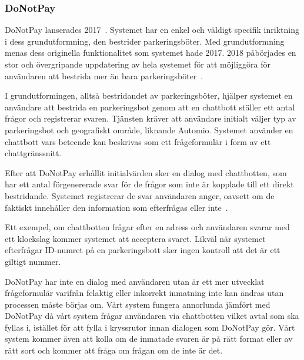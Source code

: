 \documentclass[a4paper,12pt]{article}
\begin{document}

\subsubsection{DoNotPay}
DoNotPay lanserades 2017~\cite{web:daily-mail-DoNotPay}. Systemet har en enkel och väldigt specifik inriktning i dess grundutformning, den bestrider parkeringsböter. Med grundutformning menas dess originella funktionalitet som systemet hade 2017. 2018 påbörjades en stor och övergripande uppdatering av hela systemet för att möjliggöra för användaren att bestrida mer än bara parkeringsböter~\cite{web:motherboard-DoNotPay}. 

I grundutformingen, alltså  bestridandet av parkeringsböter, hjälper systemet en anv\-ändare att bestrida en parkeringsbot genom att en chattbott ställer ett antal frågor och registrerar svaren. Tjänsten kräver att användare initialt väljer typ av parkeringsbot och geografiskt område, liknande Automio. Systemet använder en chattbott vars beteende kan beskrivas som ett frågeformulär i form av ett chattgränssnitt.

Efter att DoNotPay erhållit initialvärden sker en dialog med chattbotten, som har ett antal förgenererade svar för de frågor som inte är kopplade till ett direkt bestridande. Systemet registrerar de svar användaren anger, oavsett om de faktiskt innehåller den information som efterfrågas eller inte~\cite{web:pennyhoarder-DoNotPay}.

Ett exempel, om chattbotten frågar efter en adress och användaren svarar med ett klockslag kommer systemet att acceptera svaret. Likväl när systemet efterfrågar ID-numret på en parkeringsbott sker ingen kontroll att det är ett giltigt nummer. %

DoNotPay har inte en dialog med användaren utan är ett mer utvecklat frågeformulär varifrån felaktig eller inkorrekt inmatning inte kan ändras utan processen måste börjas om. Vårt system fungera annorlunda jämfört med DoNotPay då vårt system frågar användaren via chattbotten vilket avtal som ska fyllas i, istället för att fylla i kryssrutor innan dialogen som DoNotPay gör. Vårt system kommer även att kolla om de inmatade svaren är på rätt format eller av rätt sort och kommer att fråga om frågan om de inte är det.
\end{document}
